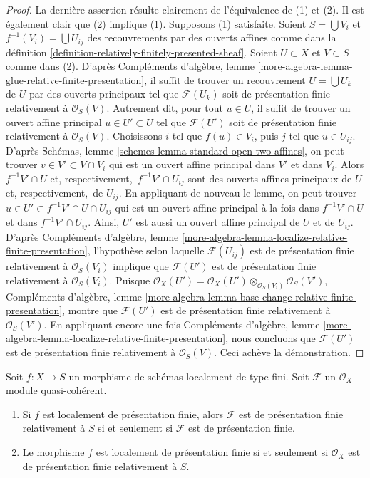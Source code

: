 \begin{proof}
La dernière assertion résulte clairement de l'équivalence de (1) et (2).
Il est également clair que (2) implique (1). Supposons (1) satisfaite.
Soient $S = \bigcup V_i$ et $f^{-1}(V_i) = \bigcup U_{ij}$ des
recouvrements par des ouverts affines comme dans la
définition \ref{definition-relatively-finitely-presented-sheaf}.
Soient $U \subset X$ et $V \subset S$ comme dans (2).
D'après Compléments d'algèbre, lemme
\ref{more-algebra-lemma-glue-relative-finite-presentation},
il suffit de trouver un recouvrement $U = \bigcup U_k$ de $U$ par des ouverts principaux
tel que $\mathcal{F}(U_k)$ soit de présentation finie relativement à
$\mathcal{O}_S(V)$. Autrement dit, pour tout $u \in U$, il suffit
de trouver un ouvert affine principal $u \in U' \subset U$ tel que
$\mathcal{F}(U')$ soit de présentation finie relativement à $\mathcal{O}_S(V)$.
Choisissons $i$ tel que $f(u) \in V_i$, puis $j$ tel que
$u \in U_{ij}$. D'après
Schémas, lemme \ref{schemes-lemma-standard-open-two-affines},
on peut trouver $v \in V' \subset V \cap V_i$ qui est un ouvert affine principal
dans $V'$ et dans $V_i$. Alors $f^{-1}V'  \cap U$ et, respectivement,\ $f^{-1}V' \cap U_{ij}$
sont des ouverts affines principaux de $U$ et, respectivement,\ de $U_{ij}$.
En appliquant de nouveau le lemme, on peut trouver
$u \in U' \subset f^{-1}V' \cap U \cap U_{ij}$ qui est un ouvert affine principal
à la fois dans $f^{-1}V'  \cap U$ et dans $f^{-1}V' \cap U_{ij}$.
Ainsi, $U'$ est aussi un ouvert affine principal de $U$ et de $U_{ij}$.
D'après Compléments d'algèbre, lemme
\ref{more-algebra-lemma-localize-relative-finite-presentation},
l'hypothèse selon laquelle $\mathcal{F}(U_{ij})$ est de présentation finie
relativement à $\mathcal{O}_S(V_i)$ implique que
$\mathcal{F}(U')$ est de présentation finie relativement à $\mathcal{O}_S(V_i)$.
Puisque $\mathcal{O}_X(U') =
\mathcal{O}_X(U') \otimes_{\mathcal{O}_S(V_i)} \mathcal{O}_S(V')$,
Compléments d'algèbre, lemme
\ref{more-algebra-lemma-base-change-relative-finite-presentation},
montre que $\mathcal{F}(U')$ est de présentation finie relativement à $\mathcal{O}_S(V')$.
En appliquant encore une fois Compléments d'algèbre, lemme
\ref{more-algebra-lemma-localize-relative-finite-presentation},
nous concluons que
$\mathcal{F}(U')$ est de présentation finie relativement à $\mathcal{O}_S(V)$.
Ceci achève la démonstration.
\end{proof}

\begin{lemma}
\label{lemma-relative-finite-presentation}
Soit $f : X \to S$ un morphisme de schémas localement de type
fini. Soit $\mathcal{F}$ un $\mathcal{O}_X$-module quasi-cohérent.
\begin{enumerate}
\item Si $f$ est localement de présentation finie, alors $\mathcal{F}$
est de présentation finie relativement à $S$ si et seulement si $\mathcal{F}$
est de présentation finie.
\item Le morphisme $f$ est localement de présentation finie si et seulement
si $\mathcal{O}_X$ est de présentation finie relativement à $S$.
\end{enumerate}
\end{lemma}

